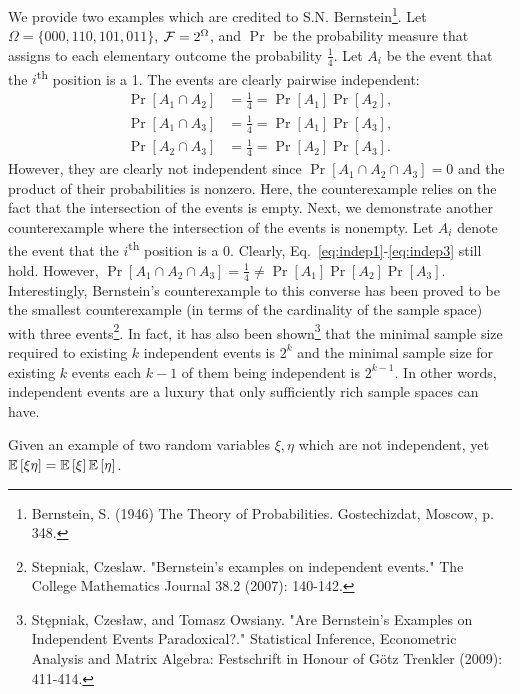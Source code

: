 \begin{solution}
    We provide two examples which are credited to S.N. Bernstein\footnote{Bernstein, S. (1946) The Theory of Probabilities. Gostechizdat, Moscow, p. 348.}. Let $\Omega = \{000, 110, 101, 011\}$, $\mathcal{F} = 2^\Omega$, and $\Pr$ be the probability measure that assigns to each elementary outcome the probability $\frac{1}{4}$. Let $A_i$ be the event that the $i$\textsuperscript{th} position is a 1. The events are clearly pairwise independent:
    \begin{align}
        \Pr[A_1 \cap A_2] &= \frac{1}{4} = \Pr[A_1]\Pr[A_2], \label{eq:indep1}\\
        \Pr[A_1 \cap A_3] &= \frac{1}{4} = \Pr[A_1]\Pr[A_3], \label{eq:indep2}\\
        \Pr[A_2 \cap A_3] &= \frac{1}{4} = \Pr[A_2]\Pr[A_3]. \label{eq:indep3}
    \end{align}
    However, they are clearly not independent since $\Pr[A_1\cap A_2\cap A_3] = 0$ and the product of their probabilities is nonzero. Here, the counterexample relies on the fact that the intersection of the events is empty. Next, we demonstrate another counterexample where the intersection of the events is nonempty. Let $A_i$ denote the event that the $i$\textsuperscript{th} position is a 0. Clearly, Eq.~\ref{eq:indep1}-\ref{eq:indep3} still hold. However, $\Pr[A_1 \cap A_2 \cap A_3] = \frac{1}{4} \neq \Pr[A_1]\Pr[A_2]\Pr[A_3]$. 
    Interestingly, Bernstein's counterexample to this converse has been proved to be the smallest counterexample (in terms of the cardinality of the sample space) with three events\footnote{Stepniak, Czeslaw. "Bernstein's examples on independent events." The College Mathematics Journal 38.2 (2007): 140-142.}. In fact, it has also been shown\footnote{Stępniak, Czesław, and Tomasz Owsiany. "Are Bernstein's Examples on Independent Events Paradoxical?." Statistical Inference, Econometric Analysis and Matrix Algebra: Festschrift in Honour of Götz Trenkler (2009): 411-414.} that the minimal sample size required to existing $k$ independent events is $2^k$ and the minimal sample size for existing $k$ events each $k-1$ of them being independent is $2^{k-1}$. In other words, independent events are a luxury that only sufficiently rich sample spaces can have. 
\end{solution}
\begin{problem}{6}
    Given an example of two random variables $\xi, \eta$ which are not independent, yet $\mathbb{E}\left[\xi\eta\right] = \mathbb{E}\left[\xi\right]\mathbb{E}\left[\eta\right]$. 
\end{problem}
\begin{solution}
    
\end{solution}

